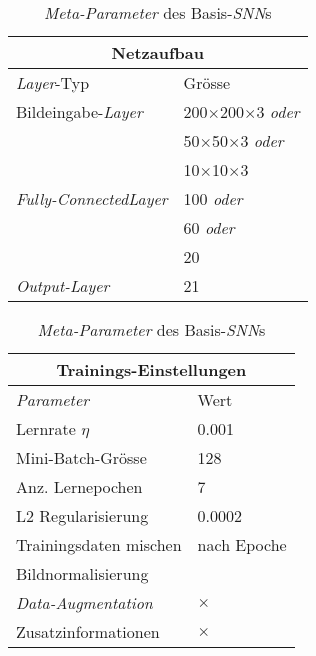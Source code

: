 \begin{table}[!htb]
	\def\arraystretch{1.4}
	\centering
	\begin{subtable}[t]{.5\linewidth}
		\begin{tabular}[t]{l | l }
			\multicolumn{2}{c}{\textbf{Netzaufbau}}\\
			\hline
			\textit{Layer}-Typ & Grösse\\
			\hline
			\hline
			Bildeingabe-\textit{Layer} & 200$\times$200$\times$3 \textit{oder}\\
			& 50$\times$50$\times$3 \textit{oder}\\
			& 10$\times$10$\times$3\\
			\hline
			
			\textit{Fully-ConnectedLayer}& 100 \textit{oder}\\
			& 60 \textit{oder}\\
			& 20\\
			\hline
			\textit{Output-Layer}& 21\\
		\end{tabular}
	\end{subtable}%
	\begin{subtable}[t]{.5\linewidth}
		\begin{tabular}[t]{l | l }
			\multicolumn{2}{c}{\textbf{Trainings-Einstellungen}}\\
			\hline
			\textit{Parameter} & Wert\\
			\hline
			\hline
			Lernrate $\eta$ & 0.001\\
			Mini-Batch-Grösse & 128\\
			Anz. Lernepochen & 7\\
			L2 Regularisierung & 0.0002\\
			Trainingsdaten mischen& nach Epoche\\
			Bildnormalisierung & \checkmark\\
			\textit{Data-Augmentation}& $\times$ \\
			Zusatzinformationen &  $\times$ \\
		\end{tabular}
	\end{subtable} 
	\caption{\textit{Meta-Parameter} des Basis-\textit{SNN}s}
	\label{table:basic_snn_training}
\end{table}

